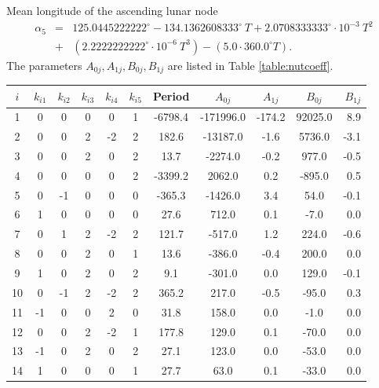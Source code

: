 \documentclass [12pt, a4paper] {article}
\begin{document}
Mean longitude of the ascending lunar node
\begin {eqnarray}
  \alpha_5 &=& 125.0445222222^\circ - 134.1362608333^\circ\:T + 2.0708333333^\circ\cdot 10^{-3}\:T^2
  \\\nonumber &+& (2.2222222222^\circ\cdot 10^{-6}\:T^3)
        - (5.0 \cdot 360.0^\circ T).
\end {eqnarray}
The parameters $A_{0j}, A_{1j}, B_{0j}, B_{1j}$ are listed in Table \ref{table:nutcoeff}. 
\begin {center}
  \begin {longtable}{| c | c c c c c | c | c | c | c | r |}
    \hline 
    $i$ & $k_{i1}$ & $k_{i2}$ & $k_{i3}$ & $k_{i4}$ &  $k_{i5}$ & Period & $A_{0j}$ & $A_{1j}$ & $B_{0j}$  & $B_{1j}$ \\
    \hline
    \endhead
      1 & 0&   0&   0&   0&   1&   -6798.4& -171996.0&    -174.2&   92025.0&       8.9 \\
      2 & 0&   0&   2&  -2&   2&     182.6&  -13187.0&      -1.6&    5736.0&      -3.1 \\
      3 & 0&   0&   2&   0&   2&      13.7&   -2274.0&      -0.2&     977.0&      -0.5 \\
      4 & 0&   0&   0&   0&   2&   -3399.2&    2062.0&       0.2&    -895.0&       0.5 \\
      5 & 0&  -1&   0&   0&   0&    -365.3&   -1426.0&       3.4&      54.0&      -0.1 \\
      6 & 1&   0&   0&   0&   0&      27.6&     712.0&       0.1&      -7.0&       0.0 \\
      7 & 0&   1&   2&  -2&   2&     121.7&    -517.0&       1.2&     224.0&      -0.6 \\
      8 & 0&   0&   2&   0&   1&      13.6&    -386.0&      -0.4&     200.0&       0.0 \\
      9 & 1&   0&   2&   0&   2&       9.1&    -301.0&       0.0&     129.0&      -0.1 \\
      10 & 0&  -1&   2&  -2&   2&     365.2&     217.0&      -0.5&     -95.0&       0.3 \\
      11 & -1&   0&   0&   2&   0&      31.8&     158.0&       0.0&      -1.0&       0.0 \\
      12 & 0&   0&   2&  -2&   1&     177.8&     129.0&       0.1&     -70.0&       0.0 \\
      13 & -1&   0&   2&   0&   2&      27.1&     123.0&       0.0&     -53.0&       0.0 \\
      14 & 1&   0&   0&   0&   1&      27.7&      63.0&       0.1&     -33.0&       0.0 \\

\end{longtable}
\end{center}
\end{document}
